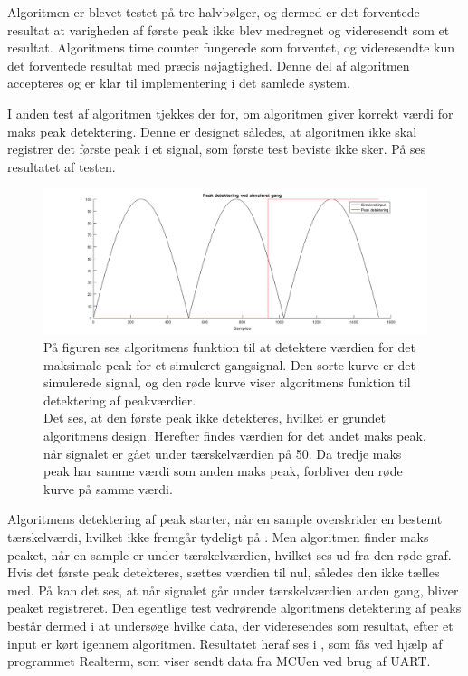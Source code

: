 Algoritmen er blevet testet på tre halvbølger, og dermed er det forventede resultat at varigheden af første peak ikke blev medregnet og videresendt som et resultat. Algoritmens time counter fungerede som forventet, og videresendte kun det forventede resultat med præcis nøjagtighed. Denne del af algoritmen accepteres og er klar til implementering i det samlede system.

I anden test af algoritmen tjekkes der for, om algoritmen giver korrekt værdi for maks peak detektering. Denne er designet således, at algoritmen ikke skal registrer det første peak i et signal, som første test beviste ikke sker. På  ses resultatet af testen.
\begin{figure}[H]
	\centering
	\includegraphics[width=.9\textwidth]{figures/cDesign/test_peak_gang.png}
	\caption{På figuren ses algoritmens funktion til at detektere værdien for det maksimale peak for et simuleret gangsignal. Den sorte kurve er det simulerede signal, og den røde kurve viser algoritmens funktion til detektering af peakværdier. \\
	Det ses, at den første peak ikke detekteres, hvilket er grundet algoritmens design. Herefter findes værdien for det andet maks peak, når signalet er gået under tærskelværdien på 50. Da tredje maks peak har samme værdi som anden maks peak, forbliver den røde kurve på samme værdi.}
	\label{fig:test_peak_gang}
\end{figure}\vspace{-.5cm}
Algoritmens detektering af peak starter, når en sample overskrider en bestemt tærskelværdi, hvilket ikke fremgår tydeligt på . Men algoritmen finder maks peaket, når en sample er under tærskelværdien, hvilket ses ud fra den røde graf. Hvis det første peak detekteres, sættes værdien til nul, således den ikke tælles med. På  kan det ses, at når signalet går under tærskelværdien anden gang, bliver peaket registreret. Den egentlige test vedrørende algoritmens detektering af peaks består dermed i at undersøge hvilke data, der videresendes som resultat, efter et input er kørt igennem algoritmen. Resultatet heraf ses i , som fås ved hjælp af programmet Realterm, som viser sendt data fra MCUen ved brug af UART.
